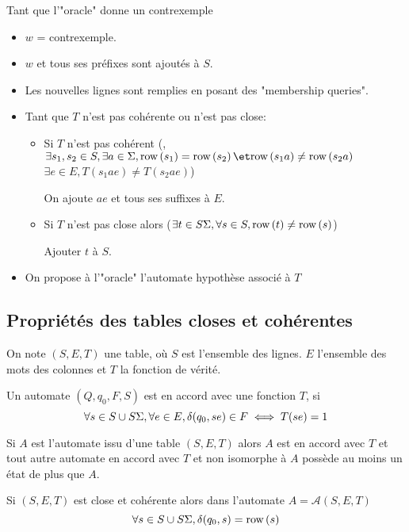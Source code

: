 Tant que l'"oracle" donne un contrexemple
\begin{itemize}
	\item $w$ = contrexemple.
	\item $w$ et tous ses préfixes sont ajoutés à $S$.
	\item Les nouvelles lignes sont remplies en posant des "membership queries".
	\item Tant que $T$ n'est pas cohérente ou n'est pas close:
	      \begin{itemize}
		      \item Si $T$ n'est pas cohérent (\cad, $\exists s_1, s_2 \in S, \exists a \in \alphabet, \row{s_1} = \row{s_2} \et \row{s_1a} \neq \row{s_2a}$
		            \cad $\exists e \in E, T (s_1ae) \neq T(s_2ae)$)

		            On ajoute $ae$ et tous ses suffixes à $E$.
		      \item Si $T$ n'est pas close alors ($\exists t \in S \Sigma, \forall s \in S, \text{row}\left(t\right) \neq \text{row}\left(s\right)$)

		            Ajouter $t$ à $S$.
	      \end{itemize}
	\item On propose à l'"oracle" l'automate hypothèse associé à $T$
\end{itemize}

\subsection{Propriétés des tables closes et cohérentes}

\begin{notation}
	On note $(S,E,T)$ une table, où $S$ est l'ensemble des lignes. $E$ l'ensemble des mots des colonnes et $T$ la fonction de vérité.
\end{notation}

\begin{definition}
	Un automate $(Q, q_0, F, S)$ est en accord avec une fonction $T$, si
	$$ \forall s \in S \cup S\Sigma, \forall e \in E, \delta(q_0,se) \in F \iff T(se) = 1$$
\end{definition}

\begin{theorem}
	Si $A$ est l'automate issu d'une table $(S,E,T)$ alors $A$ est en accord avec $T$ et tout autre
	automate en accord avec $T$ et non isomorphe à $A$ possède au moins un état de plus que $A$.
\end{theorem}

\begin{lemma} \label{lem:learning-9}
	Si $(S,E,T)$ est close et cohérente alors dans l'automate $A = \mathcal A (S,E,T)$
	$$\forall s \in S \cup S\Sigma, \delta(q_0,s) = \text{row}\left(s\right)$$
\end{lemma}

